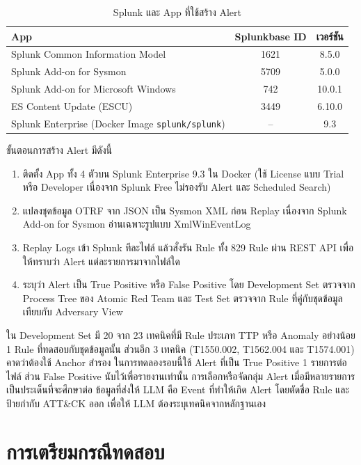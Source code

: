 \begin{table}[ht]
  \centering
  \caption{Splunk และ App ที่ใช้สร้าง Alert}
  \label{tab:splunk-apps}
  \small
  \begin{tabular}{|l|c|c|}
    \hline
    \textbf{App} & \textbf{Splunkbase ID} & \textbf{เวอร์ชัน} \\ \hline
    Splunk Common Information Model & 1621 & 8.5.0 \\ \hline
    Splunk Add-on for Sysmon & 5709 & 5.0.0 \\ \hline
    Splunk Add-on for Microsoft Windows & 742 & 10.0.1 \\ \hline
    ES Content Update (ESCU) & 3449 & 6.10.0 \\ \hline
    Splunk Enterprise (Docker Image \texttt{splunk/splunk}) & -- & 9.3 \\ \hline
  \end{tabular}
\end{table}

ขั้นตอนการสร้าง Alert มีดังนี้
\begin{enumerate}
  \item ติดตั้ง App ทั้ง 4 ตัวบน Splunk Enterprise 9.3 ใน Docker (ใช้ License แบบ Trial หรือ Developer
        เนื่องจาก Splunk Free ไม่รองรับ Alert และ Scheduled Search)
  \item แปลงชุดข้อมูล OTRF จาก JSON เป็น Sysmon XML ก่อน Replay
        เนื่องจาก Splunk Add-on for Sysmon อ่านเฉพาะรูปแบบ XmlWinEventLog
  \item Replay Logs เข้า Splunk ทีละไฟล์ แล้วสั่งรัน Rule ทั้ง 829 Rule ผ่าน REST API
        เพื่อให้ทราบว่า Alert แต่ละรายการมาจากไฟล์ใด
  \item ระบุว่า Alert เป็น True Positive หรือ False Positive
        โดย Development Set ตรวจจาก Process Tree ของ Atomic Red Team
        และ Test Set ตรวจจาก Rule ที่คู่กับชุดข้อมูลเทียบกับ Adversary View
\end{enumerate}

ใน Development Set มี 20 จาก 23 เทคนิคที่มี Rule ประเภท TTP หรือ Anomaly อย่างน้อย 1 Rule
ที่ทดสอบกับชุดข้อมูลนั้น ส่วนอีก 3 เทคนิค (T1550.002, T1562.004 และ T1574.001) คาดว่าต้องใช้ Anchor สำรอง
ในการทดลองรอบนี้ใช้ Alert ที่เป็น True Positive 1 รายการต่อไฟล์ ส่วน False Positive นับไว้เพื่อรายงานเท่านั้น
การเลือกหรือจัดกลุ่ม Alert เมื่อมีหลายรายการเป็นประเด็นที่จะศึกษาต่อ
ข้อมูลที่ส่งให้ LLM คือ Event ที่ทำให้เกิด Alert โดยตัดชื่อ Rule และป้ายกำกับ ATT\&CK ออก
เพื่อให้ LLM ต้องระบุเทคนิคจากหลักฐานเอง

\section{การเตรียมกรณีทดสอบ}
\label{sec:case-prep}

